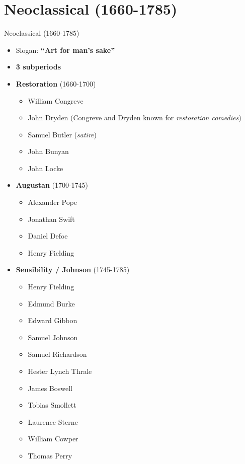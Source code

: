 \documentclass[
  12pt,
    progressbar=frametitle]{beamer}
\providecommand{\tightlist}{%
  \setlength{\itemsep}{0pt}\setlength{\parskip}{0pt}}
\begin{document}
\section{Neoclassical (1660-1785)}
\begin{frame}[allowframebreaks]
{Neoclassical (1660-1785)}
\begin{itemize}
\tightlist
\item
  Slogan: \textbf{``Art for man's sake''}
\item
  \textbf{3 subperiods}
\item
  \textbf{Restoration} (1660-1700)

  \begin{itemize}
  \tightlist
  \item
    William Congreve
  \item
    John Dryden (Congreve and Dryden known for \emph{restoration
    comedies})
  \item
    Samuel Butler (\emph{satire})
  \item
    John Bunyan
  \item
    John Locke
  \end{itemize}
\item
  \textbf{Augustan} (1700-1745)

  \begin{itemize}
  \tightlist
  \item
    Alexander Pope
  \item
    Jonathan Swift
  \item
    Daniel Defoe
  \item
    Henry Fielding
  \end{itemize}
\item
  \textbf{Sensibility / Johnson} (1745-1785)

  \begin{itemize}
  \tightlist
  \item
    Henry Fielding
  \item
    Edmund Burke
  \item
    Edward Gibbon
  \item
    Samuel Johnson
  \item
    Samuel Richardson
  \item
    Hester Lynch Thrale
  \item
    James Boswell
  \item
    Tobias Smollett
  \item
    Laurence Sterne
  \item
    William Cowper
  \item
    Thomas Perry
  \end{itemize}
\end{itemize}
\end{frame}
\end{document}
